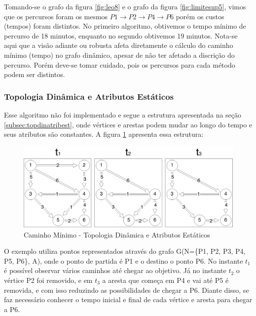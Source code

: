 Tomando-se o grafo da figura \ref{fig:leo8} e o grafo da figura \ref{fig:limitesup5}, vimos que os percursos
foram os mesmos $P1 \rightarrow P2 \rightarrow P4 \rightarrow P6$ porém os custos (tempos) foram distintos.
No primeiro algoritmo, obtivemos o tempo mínimo de percurso de 18 minutos, enquanto no segundo obtivemos 19 minutos.
Nota-se aqui que a visão adiante ou robusta afeta diretamente o cálculo do caminho mínimo (tempo) no grafo dinâmico,
apesar de não ter afetado a discrição do percurso.
Porém deve-se tomar cuidado, pois os percursos para cada método podem ser distintos.


\subsubsection{Topologia Dinâmica e Atributos Estáticos}
Esse algoritmo não foi implementado e segue a estrutura apresentada na seção \ref{subsec:topdinatribest},
onde vértices e arestas podem mudar ao longo do tempo e seus atributos são constantes. A 
figura \ref{fig:pathtopdyn} apresenta essa estrutura:

\begin{figure}[htbp]
\centering
 \includegraphics[width=.80\textwidth]{figuras/pathtopdyn.png}
\caption{Caminho Mínimo - Topologia Dinâmica e Atributos Estáticos}
\label{fig:pathtopdyn}
\end{figure}
\FloatBarrier
O exemplo utiliza pontos representados através do grafo G(N=\{P1, P2, P3, P4, P5, P6\}, A), onde o 
ponto de partida é P1 e o destino o ponto P6. No instante $t_1$ é possível observar vários caminhos
até chegar ao objetivo. Já no instante $t_2$ o vértice P2 foi removido, e em $t_3$ a aresta que começa em
P4 e vai até P5 é removida, e com isso reduzindo as possibilidades de chegar a P6. Diante disso,
se faz necessário conhecer o tempo inicial e final de cada vértice e aresta para chegar a P6.

